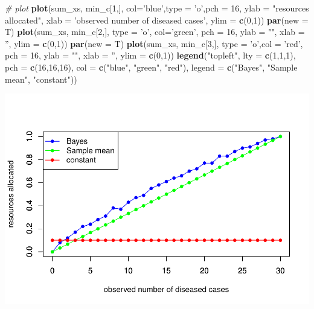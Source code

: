 \documentclass[
]{article}
\newenvironment{Shaded}{\begin{snugshade}}{\end{snugshade}}
\newcommand{\CommentTok}[1]{\textcolor[rgb]{0.56,0.35,0.01}{\textit{#1}}}
\newcommand{\DataTypeTok}[1]{\textcolor[rgb]{0.13,0.29,0.53}{#1}}
\newcommand{\DecValTok}[1]{\textcolor[rgb]{0.00,0.00,0.81}{#1}}
\newcommand{\KeywordTok}[1]{\textcolor[rgb]{0.13,0.29,0.53}{\textbf{#1}}}
\newcommand{\NormalTok}[1]{#1}
\newcommand{\StringTok}[1]{\textcolor[rgb]{0.31,0.60,0.02}{#1}}
\begin{document}
\begin{Shaded}
\begin{Highlighting}[]
\CommentTok{# plot}
\KeywordTok{plot}\NormalTok{(sum_xs, min_c[}\DecValTok{1}\NormalTok{,], }\DataTypeTok{col=}\StringTok{'blue'}\NormalTok{,}\DataTypeTok{type =} \StringTok{'o'}\NormalTok{,}\DataTypeTok{pch =} \DecValTok{16}\NormalTok{, }
     \DataTypeTok{ylab =} \StringTok{"resources allocated"}\NormalTok{, }\DataTypeTok{xlab =} \StringTok{'observed number of diseased cases'}\NormalTok{,}
     \DataTypeTok{ylim =} \KeywordTok{c}\NormalTok{(}\DecValTok{0}\NormalTok{,}\DecValTok{1}\NormalTok{))}
\KeywordTok{par}\NormalTok{(}\DataTypeTok{new =}\NormalTok{ T)}
\KeywordTok{plot}\NormalTok{(sum_xs, min_c[}\DecValTok{2}\NormalTok{,], }\DataTypeTok{type =} \StringTok{'o'}\NormalTok{, }\DataTypeTok{col=}\StringTok{'green'}\NormalTok{, }
     \DataTypeTok{pch =} \DecValTok{16}\NormalTok{, }\DataTypeTok{ylab =} \StringTok{""}\NormalTok{, }\DataTypeTok{xlab =} \StringTok{''}\NormalTok{, }\DataTypeTok{ylim =} \KeywordTok{c}\NormalTok{(}\DecValTok{0}\NormalTok{,}\DecValTok{1}\NormalTok{))}
\KeywordTok{par}\NormalTok{(}\DataTypeTok{new =}\NormalTok{ T)}
\KeywordTok{plot}\NormalTok{(sum_xs, min_c[}\DecValTok{3}\NormalTok{,], }\DataTypeTok{type =} \StringTok{'o'}\NormalTok{,}\DataTypeTok{col =} \StringTok{'red'}\NormalTok{,}
     \DataTypeTok{pch =} \DecValTok{16}\NormalTok{, }\DataTypeTok{ylab =} \StringTok{""}\NormalTok{, }\DataTypeTok{xlab =} \StringTok{''}\NormalTok{, }\DataTypeTok{ylim =} \KeywordTok{c}\NormalTok{(}\DecValTok{0}\NormalTok{,}\DecValTok{1}\NormalTok{))}
\KeywordTok{legend}\NormalTok{(}\StringTok{"topleft"}\NormalTok{, }\DataTypeTok{lty =} \KeywordTok{c}\NormalTok{(}\DecValTok{1}\NormalTok{,}\DecValTok{1}\NormalTok{,}\DecValTok{1}\NormalTok{), }\DataTypeTok{pch =} \KeywordTok{c}\NormalTok{(}\DecValTok{16}\NormalTok{,}\DecValTok{16}\NormalTok{,}\DecValTok{16}\NormalTok{),}
       \DataTypeTok{col =} \KeywordTok{c}\NormalTok{(}\StringTok{"blue"}\NormalTok{, }\StringTok{"green"}\NormalTok{, }\StringTok{"red"}\NormalTok{),}
       \DataTypeTok{legend =} \KeywordTok{c}\NormalTok{(}\StringTok{"Bayes"}\NormalTok{, }\StringTok{"Sample mean"}\NormalTok{, }\StringTok{"constant"}\NormalTok{))}
\end{Highlighting}
\end{Shaded}

\includegraphics{lab-03_files/figure-latex/unnamed-chunk-6-1.pdf}
\end{document}
